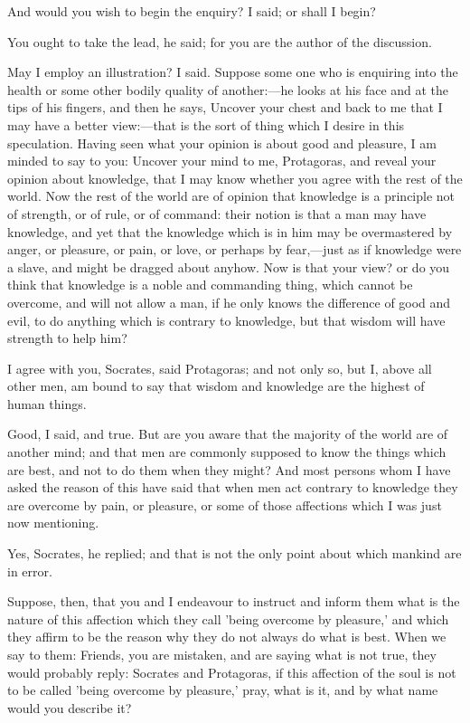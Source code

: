 \documentclass[11pt,letter]{article}
\begin{document}
\par  And would you wish to begin the enquiry? I said; or shall I begin?

\par  You ought to take the lead, he said; for you are the author of the discussion.

\par  May I employ an illustration? I said. Suppose some one who is enquiring into the health or some other bodily quality of another:—he looks at his face and at the tips of his fingers, and then he says, Uncover your chest and back to me that I may have a better view:—that is the sort of thing which I desire in this speculation. Having seen what your opinion is about good and pleasure, I am minded to say to you: Uncover your mind to me, Protagoras, and reveal your opinion about knowledge, that I may know whether you agree with the rest of the world. Now the rest of the world are of opinion that knowledge is a principle not of strength, or of rule, or of command: their notion is that a man may have knowledge, and yet that the knowledge which is in him may be overmastered by anger, or pleasure, or pain, or love, or perhaps by fear,—just as if knowledge were a slave, and might be dragged about anyhow. Now is that your view? or do you think that knowledge is a noble and commanding thing, which cannot be overcome, and will not allow a man, if he only knows the difference of good and evil, to do anything which is contrary to knowledge, but that wisdom will have strength to help him?

\par  I agree with you, Socrates, said Protagoras; and not only so, but I, above all other men, am bound to say that wisdom and knowledge are the highest of human things.

\par  Good, I said, and true. But are you aware that the majority of the world are of another mind; and that men are commonly supposed to know the things which are best, and not to do them when they might? And most persons whom I have asked the reason of this have said that when men act contrary to knowledge they are overcome by pain, or pleasure, or some of those affections which I was just now mentioning.

\par  Yes, Socrates, he replied; and that is not the only point about which mankind are in error.

\par  Suppose, then, that you and I endeavour to instruct and inform them what is the nature of this affection which they call 'being overcome by pleasure,' and which they affirm to be the reason why they do not always do what is best. When we say to them: Friends, you are mistaken, and are saying what is not true, they would probably reply: Socrates and Protagoras, if this affection of the soul is not to be called 'being overcome by pleasure,' pray, what is it, and by what name would you describe it?
\end{document}
